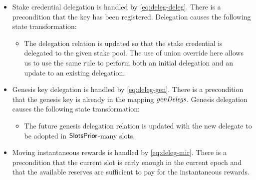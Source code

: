 \begin{itemize}
  \item Stake credential delegation is handled by \cref{eq:deleg-deleg}.
    There is a precondition that the key has been registered.
    Delegation causes the following state transformation:
    \begin{itemize}
    \item The delegation relation is updated so that the stake credential is
      delegated to the given stake pool. The use of union override here allows
      us to use the same rule to perform both an initial delegation and an
      update to an existing delegation.
    \end{itemize}

  \item Genesis key delegation is handled by \cref{eq:deleg-gen}.
    There is a precondition that the genesis key is already in the mapping $\mathit{genDelegs}$.
    Genesis delegation causes the following state transformation:
    \begin{itemize}
      \item The future genesis delegation relation is updated with the new delegate
        to be adopted in $\mathsf{SlotsPrior}$-many slots.
      \end{itemize}

    \item  Moving instantaneous rewards is handled by \cref{eq:deleg-mir}. There
      is a precondition that the current slot is early enough in the current
      epoch and that the available reserves are sufficient to pay for the
      instantaneous rewards.
\end{itemize}



